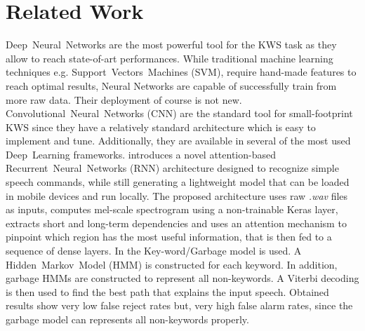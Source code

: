 
\section{Related Work}
\label{sec:related_work}

\noindent 
\mbox{Deep Neural Networks} are the most powerful tool for the KWS task as they allow to reach state-of-art performances. \cite {Jansson-2018} While traditional machine learning techniques e.g. \mbox{Support Vectors Machines} (SVM), require hand-made features to reach optimal results, Neural Networks are capable of successfully train from more raw data. \cite{Tang-2018} Their deployment of course is not new. \mbox{Convolutional Neural Networks} (CNN) are the standard tool for small-footprint KWS since they have a relatively standard architecture which is easy to implement and tune. Additionally, they are available in several of the most used \mbox{Deep Learning} frameworks. \cite{Andrade-2018} introduces a novel attention-based \mbox{Recurrent Neural Networks} (RNN) architecture designed to recognize simple speech commands, while still generating a lightweight model that can be loaded in mobile devices and run locally. The proposed architecture uses raw {\it .wav} files as inputs, computes mel-scale spectrogram using a non-trainable Keras layer, extracts short and long-term dependencies and uses an attention mechanism to pinpoint which region has the most useful information, that is then fed to a sequence of dense layers. In \cite{Zang-2018} the \mbox{Key-word/Garbage} model is used. A \mbox{Hidden Markov Model} (HMM) is constructed for each keyword. In addition, garbage HMMs are constructed to represent all non-keywords. A Viterbi decoding is then used to find the best path that explains the input speech. Obtained results show very low false reject rates but, very high false alarm rates, since the garbage model can represents all non-keywords properly.

%
